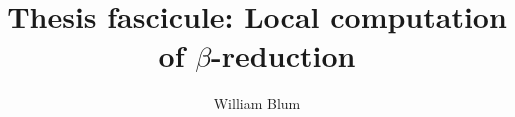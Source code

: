 

\author{William Blum}
\title{Thesis fascicule: Local computation of $\beta$-reduction}


    \maketitle
    \tableofcontents

    

    
    


